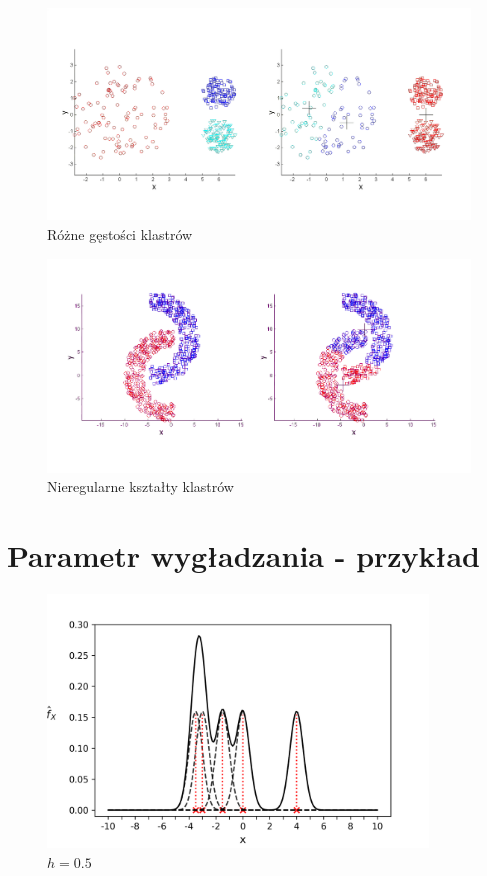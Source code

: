 \begin{figure}[H]
\includegraphics[width=\textwidth]{img/kmeans_density}
\caption{Różne gęstości klastrów \cite{Luk}}
\end{figure}

\begin{figure}[H]
\includegraphics[width=\textwidth]{img/kmeans_irregular}
\caption{Nieregularne kształty klastrów \cite{Luk}} 
\end{figure}

\section{Parametr wygładzania - przykład}
\label{sec:dod_h}

\begin{figure}[H]
\includegraphics[width=0.9\textwidth]{img/h_05}
\caption{$h=0.5$ \cite{Fra}}
\end{figure}

